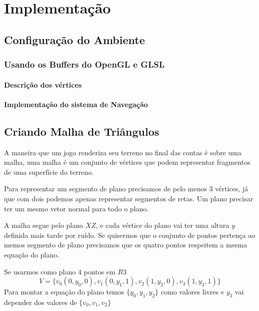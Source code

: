


\chapter{Implementação}

\section{Configuração do Ambiente}

\subsection{Usando os Buffers do OpenGL e GLSL}

\subsubsection{Descrição dos vértices}

\subsubsection{Implementação do sistema de Navegação}


\section{Criando Malha de Triângulos}
A maneira que um jogo renderiza seu terreno no final das contas é sobre uma
malha, uma malha é um conjunto de vértices que podem representar fragmentos
de uma superfície do terreno.

Para representar um segmento de plano precisamos de pelo menos $3$ vértices, 
já que com dois podemos apenas representar segmentos de retas. Um plano precisar
ter um mesmo vetor normal para todo o plano.

A malha segue pelo plano $XZ$, e cada vértice do plano vai ter uma altura
$y$ definida mais tarde por ruído. Se quisermos que o conjunto de pontos pertença
ao memos segmento de plano precisamos que os quatro pontos respeitem a mesma
equação do plano.

Se usarmos como plano $4$ pontos em $R3$
\begin{equation}\label{comp_sign_inter_sem_peso_aux}
    V = \{v_{0}(0, y_{0}, 0), v_{1}(0, y_{1}, 1), v_{2}(1, y_{2}, 0), v_{3}(1, y_{3}, 1)\}
\end{equation}
Para montar a equação do plano temos $\{y_{0}, y_{1}, y_{2}\}$ como valores livres e $y_{3}$
vai depender dos valores de $\{v_{0}, v_{1}, v_{2}\}$

